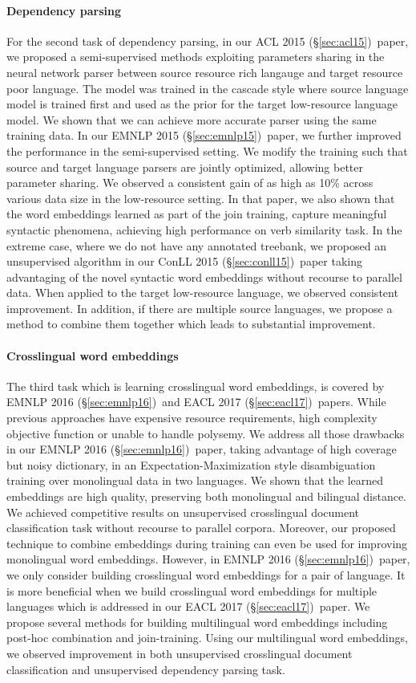\documentclass[12pt,twoside,final,hidelinks]{ltthesis}
\theoremstyle{definition}
\newcommand\conllv{ConLL 2015 (\S\ref{sec:conll15})}
\newcommand\aclv{ACL 2015 (\S\ref{sec:acl15})}
\newcommand\emnlpv{EMNLP 2015 (\S\ref{sec:emnlp15})}
\newcommand\emnlpvi{EMNLP 2016 (\S\ref{sec:emnlp16})}
\newcommand\eaclvii{EACL 2017 (\S\ref{sec:eacl17})}
\begin{document}
\paragraph{Dependency parsing} For the second task of dependency parsing, in our \aclv\ paper, we proposed a semi-supervised methods exploiting parameters sharing in the 
neural network parser between source resource rich langauge and target resource poor language. The model was trained in the cascade style 
where source language model is trained first and used as the prior for the target low-resource language model. We shown that we can achieve 
more accurate parser using the same training data. In our \emnlpv\ paper, we further improved the performance in the semi-supervised setting. We modify 
the training such that source and target language parsers are jointly optimized, allowing better parameter sharing. We observed a consistent gain
of as high as 10\% across various data size in the low-resource setting. In that paper, we also shown that the word embeddings learned as part 
of the join training, capture meaningful syntactic phenomena, achieving high performance on verb similarity task. In the extreme case, where 
we do not have any annotated treebank, we proposed an unsupervised algorithm in our \conllv\ paper taking advantaging of the novel syntactic word 
embeddings without recourse to parallel data. When applied to the target low-resource language, we observed consistent improvement. In addition, 
if there are multiple source languages, we propose a method to combine them together which leads to substantial improvement. 

\paragraph{Crosslingual word embeddings}The third task which is learning crosslingual word embeddings, is covered by \emnlpvi\ and \eaclvii\ papers. While previous approaches have expensive resource requirements, 
high complexity objective function or unable to handle polysemy. We address all those drawbacks in our \emnlpvi\ paper, taking advantage of high 
coverage but noisy dictionary, in an Expectation-Maximization style disambiguation training over monolingual data in two languages. We shown that the 
learned embeddings are high quality, preserving both monolingual and bilingual distance. We achieved competitive results on unsupervised crosslingual 
document classification task without recourse to parallel corpora. Moreover, our proposed technique to combine embeddings during training can even be used for 
improving monolingual word embeddings. However, in \emnlpvi\ paper, we only consider building crosslingual word embeddings for a pair of language. 
It is more beneficial when we build crosslingual word embeddings for multiple languages which is addressed in our \eaclvii\ paper. We propose
several methods for building multilingual word embeddings including post-hoc combination and join-training. Using our multilingual word embeddings, we observed improvement in both unsupervised crosslingual document classification and unsupervised dependency parsing task. 
\end{document}
